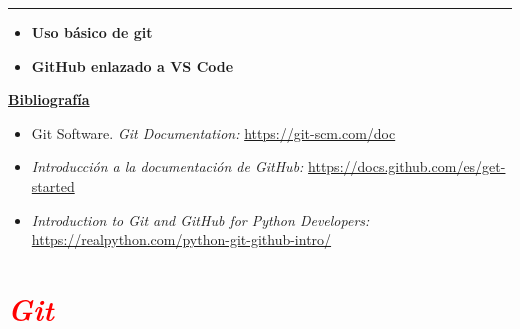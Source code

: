 \documentclass[12pt]{article}
\begin{document}
\thispagestyle{firstpage}
\vspace*{1.5cm}

\begin{center}
    \rule{\textwidth}{0.4pt}
\end{center}

\begin{itemize}[leftmargin=*,label=\textcolor{red}{\ensuremath{\blacktriangleright}}]
    \item \textbf{ Uso básico de git}
    \item \textbf{ GitHub enlazado a VS Code}
\end{itemize}

\noindent
\textbf{\underline{Bibliografía}}
\begin{itemize}[leftmargin=*, label={\textcolor{blue}{$\bullet$}}]
    \item 	Git Software. \textit{Git Documentation:}
    \url{https://git-scm.com/doc}
    \item \textit{Introducción a la documentación de GitHub: } 
    \url{https://docs.github.com/es/get-started}
    \item \textit{Introduction to Git and GitHub for Python Developers:} \\ 
    \url{https://realpython.com/python-git-github-intro/}
\end{itemize}


\section*{\textcolor{red}{\textit{Git}}}
\end{document}
